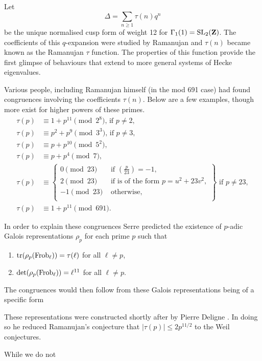 \documentclass[a4paper,12pt]{article}
\begin{document}
\begin{ex}\label{ex:delt}
Let
\[
\Delta = \sum_{n \ge 1} \tau(n) q^n
\]
be the unique normalised cusp form of weight 12 for $\Gamma_1(1) = \operatorname{SL}_2(\mathbf{Z})$.
The coefficients of this $q$-expansion were studied by Ramanujan and $\tau(n)$ became known as the Ramanujan $\tau$ function.
The properties of this function provide the first glimpse of behaviours that extend to more general systems of Hecke eigenvalues.

Various people, including Ramanujan himself (in the mod 691 case) had found congruences involving the coefficients $\tau(n)$.
Below are a few examples, though more exist for higher powers of these primes.
\begin{align}\label{eq:taucong}
\tau(p) &\equiv 1 + p^{11} \pmod{2^8}\text{, if } p \ne 2,\\
\tau(p) &\equiv p^2 + p^9 \pmod{3^3}\text{, if } p \ne 3,\\
\tau(p) &\equiv p + p^{10} \pmod{5^2},\\
\tau(p) &\equiv p + p^4 \pmod{7},\\
\tau(p) &\equiv\left.\begin{cases}
0\pmod{23} & \text{ if } \left(\frac{p}{23}\right) = -1,\\
2\pmod{23} & \text{ if is of the form } p = u^2 + 23v^2,\\
-1\pmod{23} & \text{ otherwise},\\
\end{cases}\right\}\text{ if } p \ne 23,\\
\tau(p) &\equiv 1 + p^{11} \pmod{691}.
\end{align}

In order to explain these congruences Serre predicted \cite{Serre67} the existence of $p$-adic Galois representations $\rho_p$ for each prime $p$ such that
\begin{enumerate}
\item $\operatorname{tr}(\rho_p (\operatorname{Frob}_\ell)) = \tau(\ell)$ for all $\ell \ne p$,
\item $\det(\rho_p (\operatorname{Frob}_\ell)) = \ell^{11}$ for all $\ell \ne p$.
\end{enumerate}

The congruences would then follow from these Galois representations being of a specific form 

These representations were constructed shortly after by Pierre Deligne \cite{Deligne}.
In doing so he reduced Ramanujan's conjecture that $|\tau(p)| \le 2p^{11/2}$ to the Weil conjectures.

While we do not 
\end{ex}
\end{document}
